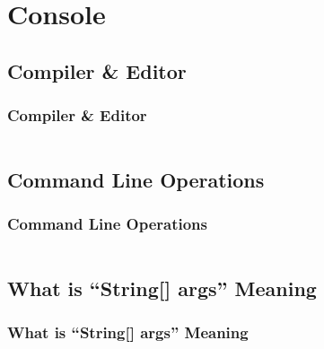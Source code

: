 \documentclass[en, 11pt, xcolor=dvipsnames]{beamer}
\begin{document}

\section{Console}
\subsection{Compiler \& Editor}
\begin{frame}[fragile]
	\frametitle{Compiler \& Editor}

	\begin{columns}
		\begin{column}{0.98\textwidth}

		\end{column}
	\end{columns}

\end{frame}

\subsection{Command Line Operations}
\begin{frame}[fragile]
	\frametitle{Command Line Operations}

	\begin{columns}
		\begin{column}{0.98\textwidth}

		\end{column}
	\end{columns}

\end{frame}

\subsection{What is ``String[] args'' Meaning}
\begin{frame}[fragile]
	\frametitle{What is ``String[] args'' Meaning}

	\begin{columns}
		\begin{column}{0.98\textwidth}

		\end{column}
	\end{columns}

\end{frame}

\end{document}
